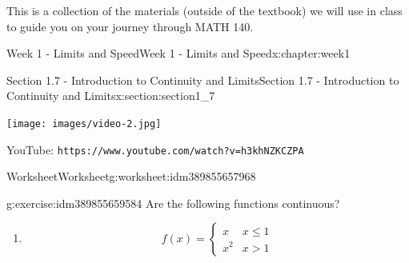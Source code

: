 \documentclass[oneside,10pt,]{book}
\newcommand{\mono}[1]{\texttt{#1}}
\numberwithin{equation}{section}
\newlength{\qrsize}
\newlength{\previewwidth}
\begin{document}
This is a collection of the materials (outside of the textbook) we will use in class to guide you on your journey through MATH 140.%
%
%
\typeout{************************************************}
\typeout{************************************************}
%
\begin{chapterptx}{Week 1 - Limits and Speed}{}{Week 1 - Limits and Speed}{}{}{x:chapter:week1}
%
%
\typeout{************************************************}
\typeout{************************************************}
%
\begin{sectionptx}{Section 1.7 - Introduction to Continuity and Limits}{}{Section 1.7 - Introduction to Continuity and Limits}{}{}{x:section:section1_7}
\setlength{\qrsize}{9em}
\setlength{\previewwidth}{\linewidth}
\addtolength{\previewwidth}{-\qrsize}
\begin{tcbraster}[raster columns=2, raster column skip=1pt, raster halign=center, raster force size=false, raster left skip=0pt, raster right skip=0pt]%
\begin{tcolorbox}[previewstyle, width=\previewwidth]%
\texttt{[image: images/video-2.jpg]}%
\end{tcolorbox}%
\begin{tcolorbox}[qrstyle]%
{\hypersetup{urlcolor=black}}%
\end{tcolorbox}%
\begin{tcolorbox}[captionstyle]%
\small YouTube: \mono{https://www.youtube.com/watch?v=h3khNZKCZPA}\end{tcolorbox}%
\end{tcbraster}%
%
%
\typeout{************************************************}
\typeout{************************************************}
%
\begin{worksheet-subsection}{Worksheet}{}{Worksheet}{}{}{g:worksheet:idm389855657968}
\begin{divisionexercise}{1}{}{}{g:exercise:idm389855659584}%
Are the following functions continuous?%
%
\begin{enumerate}[label=(\alph*)]
\item{}%
\begin{equation*}
f(x) = \left\{ \begin{matrix} x & x \leq 1 \\ x^2 & x > 1 \end{matrix} \right. 

\end{equation*}
\end{enumerate}
\end{divisionexercise}
\end{worksheet-subsection}
\end{sectionptx}
\end{chapterptx}
\end{document}
